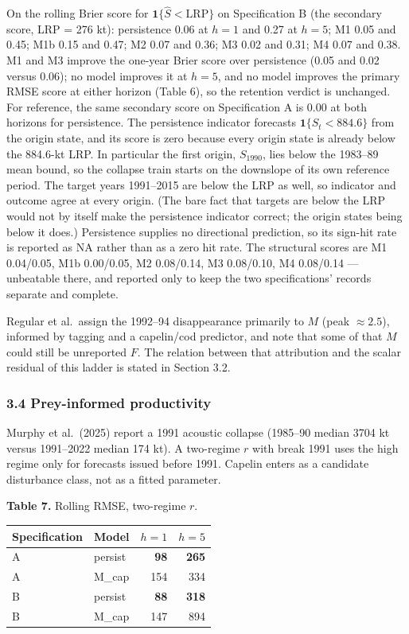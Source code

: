 \documentclass[11pt]{article}
\begin{document}
On the rolling Brier score for \(\mathbf{1}\{\hat S<\mathrm{LRP}\}\) on
Specification B (the secondary score, LRP = 276 kt):
persistence 0.06 at \(h{=}1\) and 0.27 at \(h{=}5\); M1 0.05 and 0.45;
M1b 0.15 and 0.47; M2 0.07 and 0.36; M3 0.02 and 0.31; M4 0.07 and 0.38.
M1 and M3 improve the one-year Brier score over persistence (0.05 and
0.02 versus 0.06); no model improves it at \(h{=}5\), and no model
improves the primary RMSE score at either horizon (Table 6), so the
retention verdict is unchanged. For reference, the same secondary score on Specification A is 0.00 at
both horizons for persistence. The persistence indicator forecasts
\(\mathbf{1}\{S_t<884.6\}\) from the origin state, and its score is zero
because every origin state is already below the 884.6-kt LRP. In
particular the first origin, \(S_{1990}\), lies below the 1983--89 mean
bound, so the collapse train starts on the downslope of its own
reference period. The target years 1991--2015 are below the LRP as well,
so indicator and outcome agree at every origin. (The bare fact that targets are below the LRP
would not by itself make the persistence indicator correct; the origin
states being below it does.) Persistence supplies no directional prediction, so its sign-hit rate
is reported as NA rather than as a zero hit rate. The structural
scores are M1 0.04/0.05, M1b
0.00/0.05, M2 0.08/0.14, M3 0.08/0.10, M4 0.08/0.14 --- unbeatable
there, and reported only to keep the two specifications' records
separate and complete.

Regular et al.~assign the 1992--94 disappearance primarily to \(M\)
(peak \(\approx 2.5\)), informed by tagging and a capelin/cod predictor,
and note that some of that \(M\) could still be unreported \(F\). The
relation between that attribution and the scalar residual of this ladder
is stated in Section 3.2.

\subsubsection{3.4 Prey-informed
productivity}\label{prey-informed-productivity}

Murphy et al.~(2025) report a 1991 acoustic collapse (1985--90 median
3704 kt versus 1991--2022 median 174 kt). A two-regime \(r\) with break
1991 uses the high regime only for forecasts issued before 1991. Capelin
enters as a candidate disturbance class, not as a fitted parameter.

\textbf{Table 7.} Rolling RMSE, two-regime \(r\).

\begin{longtable}[]{@{}llrr@{}}
\toprule\noalign{}
Specification & Model & \(h=1\) & \(h=5\) \\
\midrule\noalign{}
\endhead
\bottomrule\noalign{}
\endlastfoot
A & persist & \textbf{98} & \textbf{265} \\
A & M\_cap & 154 & 334 \\
B & persist & \textbf{88} & \textbf{318} \\
B & M\_cap & 147 & 894 \\
\end{longtable}
\end{document}
